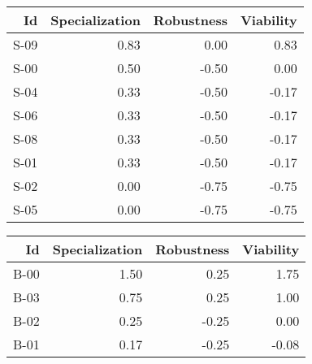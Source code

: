 


\begin{tabular}{ | r | r | r | r | }
    \hline
                    Id  &  Specialization  &      Robustness  &       Viability  \\
    \hline
    \hline
                  S-09  &            0.83  &            0.00  &            0.83  \\
    \hline
                  S-00  &            0.50  &           -0.50  &            0.00  \\
    \hline
                  S-04  &            0.33  &           -0.50  &           -0.17  \\
    \hline
                  S-06  &            0.33  &           -0.50  &           -0.17  \\
    \hline
                  S-08  &            0.33  &           -0.50  &           -0.17  \\
    \hline
                  S-01  &            0.33  &           -0.50  &           -0.17  \\
    \hline
                  S-02  &            0.00  &           -0.75  &           -0.75  \\
    \hline
                  S-05  &            0.00  &           -0.75  &           -0.75  \\
    \hline
\end{tabular}


\begin{tabular}{ | r | r | r | r | }
    \hline
                    Id  &  Specialization  &      Robustness  &       Viability  \\
    \hline
    \hline
                  B-00  &            1.50  &            0.25  &            1.75  \\
    \hline
                  B-03  &            0.75  &            0.25  &            1.00  \\
    \hline
                  B-02  &            0.25  &           -0.25  &            0.00  \\
    \hline
                  B-01  &            0.17  &           -0.25  &           -0.08  \\
    \hline
\end{tabular}


